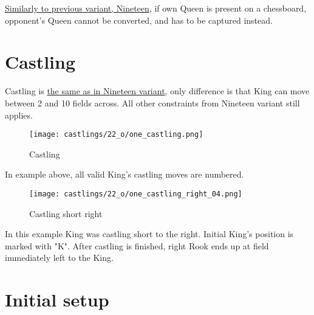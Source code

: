 \hyperref[fig:scn_n_24_only_one_queen]{Similarly to previous variant, Nineteen},
if own Queen is present on a chessboard, opponent's Queen cannot be
converted, and has to be captured instead.


\vspace*{-0.3\baselineskip}
\section*{Castling}
\label{sec:One/Castling}

\vspace*{-0.3\baselineskip}
Castling is
\hyperref[sec:Nineteen/Castling]{the same as in Nineteen variant},
only difference is that King can move
between 2 and 10 fields across. All other constraints from Nineteen variant still
applies.

\vspace*{-0.7\baselineskip}
\noindent
\begin{figure}[!h]
\texttt{[image: castlings/22\_o/one\_castling.png]}
\vspace*{-1.4\baselineskip}
\caption{Castling}
\label{fig:one_castling}
\end{figure}

\vspace*{-0.3\baselineskip}
In example above, all valid King's castling moves are numbered.

\vspace*{-0.7\baselineskip}
\noindent
\begin{figure}[!h]
\texttt{[image: castlings/22\_o/one\_castling\_right\_04.png]}
\vspace*{-1.4\baselineskip}
\caption{Castling short right}
\label{fig:one_castling_right_04}
\end{figure}

\vspace*{-0.3\baselineskip}
In this example King was castling short to the right. Initial King's position is
marked with "K". After castling is finished, right Rook ends up at field immediately
left to the King.

\clearpage %

\section*{Initial setup}
\label{sec:One/Initial setup}


